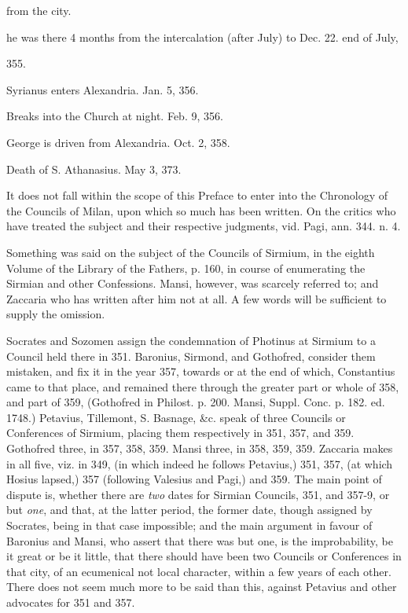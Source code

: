 from the city.

he was there 4 months from the intercalation (after
July) to Dec. 22.
end of July,

355.

Syrianus
enters Alexandria.
Jan. 5, 356.

Breaks into
the Church at night.
Feb. 9, 356.

George is
driven from Alexandria.
Oct. 2, 358.

Death of S.
Athanasius.
May 3, 373.

It does not fall within the
scope of this Preface to enter into the Chronology of the Councils of
Milan, upon which so much has been written. On the critics who have
treated the subject and their respective judgments, vid. Pagi, ann.
344. n. 4.


Something was said on the
subject of the Councils of Sirmium, in the eighth Volume of the
Library of the Fathers, p. 160, in course of enumerating the Sirmian
and other Confessions. Mansi, however, was scarcely referred to; and
Zaccaria who has written after him not at all. A few words will be
sufficient to supply the omission.

Socrates and Sozomen assign
the condemnation of Photinus at Sirmium to a Council held there in
351. Baronius, Sirmond, and Gothofred, consider them mistaken, and fix
it in the year 357, towards or at the end of which, Constantius came
to that place, and remained there through the greater part or
whole of 358, and part of 359, (Gothofred in Philost. p. 200. Mansi,
Suppl. Conc. p. 182. ed. 1748.) Petavius, Tillemont, S. Basnage,
\&c. speak of three Councils or Conferences of Sirmium, placing
them respectively in 351, 357, and 359. Gothofred three, in 357, 358,
359. Mansi three, in 358, 359, 359. Zaccaria makes in all five, viz.
in 349, (in which indeed he follows Petavius,) 351, 357, (at which
Hosius lapsed,) 357 (following Valesius and Pagi,) and 359. The main
point of dispute is, whether there are \emph{two} dates for Sirmian
Councils, 351, and 357-9, or but \emph{one}, and that, at the latter
period, the former date, though assigned by Socrates, being in that
case impossible; and the main argument in favour of Baronius and Mansi,
who assert that there was but one, is the improbability, be it great
or be it little, that there should have been two Councils or
Conferences in that city, of an ecumenical not local character, within
a few years of each other. There does not seem much more to be said
than this, against Petavius and other advocates for 351 and 357.

